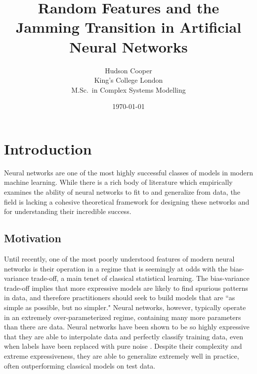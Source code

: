 \documentclass[a4paper, 12pt]{article}
\begin{document}
\title{\bf Random Features and the Jamming Transition in Artificial Neural Networks}
\author{
    Hudson Cooper\\ %
    King's College London\\
    M.Sc.\ in Complex Systems Modelling
}
\date{\today}

\begin{titlingpage}
\maketitle
\begin{abstract}
\lipsum[1]
\end{abstract}
\end{titlingpage}

\section{Introduction}
Neural networks are one of the most highly successful classes of models in modern machine learning. While there is a rich body of literature which empirically examines the ability of neural networks to fit to and generalize from data, the field is lacking a cohesive theoretical framework for designing these networks and for understanding their incredible success. \\

\subsection{Motivation}

Until recently, one of the most poorly understood features of modern neural networks is their operation in a regime that is seemingly at odds with the bias-variance trade-off, a main tenet of classical statistical learning. The bias-variance trade-off implies that more expressive models are likely to find spurious patterns in data, and therefore practitioners should seek to build models that are ``as simple as possible, but no simpler." Neural networks, however, typically operate in an extremely over-parameterized regime, containing many more parameters than there are data. Neural networks have been shown to be so highly expressive that they are able to interpolate data and perfectly classify training data, even when labels have been replaced with pure noise \cite{zhangUnderstandingDeepLearning2017}. Despite their complexity and extreme expressiveness, they are able to generalize extremely well in practice, often outperforming classical models on test data. \\
\end{document}
